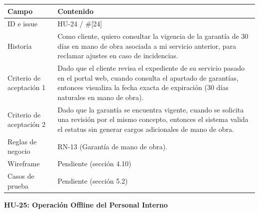 {\def\LTcaptype{none} %
\begin{longtable}[]{@{}
  >{\raggedright\arraybackslash}p{}
  >{\raggedright\arraybackslash}p{}@{}}
\toprule\noalign{}
\begin{minipage}[b]{\linewidth}\raggedright
\textbf{Campo}
\end{minipage} & \begin{minipage}[b]{\linewidth}\raggedright
\textbf{Contenido}
\end{minipage} \\
\midrule\noalign{}
\endhead
\bottomrule\noalign{}
\endlastfoot
ID e issue & HU-24 / \#{[}24{]} \\
Historia & Como cliente, quiero consultar la vigencia de la garantía de
30 días en mano de obra asociada a mi servicio anterior, para reclamar
ajustes en caso de incidencias. \\
Criterio de aceptación 1 & Dado que el cliente revisa el expediente de
su servicio pasado en el portal web, cuando consulta el apartado de
garantías, entonces visualiza la fecha exacta de expiración (30 días
naturales en mano de obra). \\
Criterio de aceptación 2 & Dado que la garantía se encuentra vigente,
cuando se solicita una revisión por el mismo concepto, entonces el
sistema valida el estatus sin generar cargos adicionales de mano de
obra. \\
Reglas de negocio & RN-13 (Garantía de mano de obra). \\
Wireframe & Pendiente (sección 4.10) \\
Casos de prueba & Pendiente (sección 5.2) \\
\end{longtable}
}

\textbf{HU-25: Operación Offline del Personal Interno}

